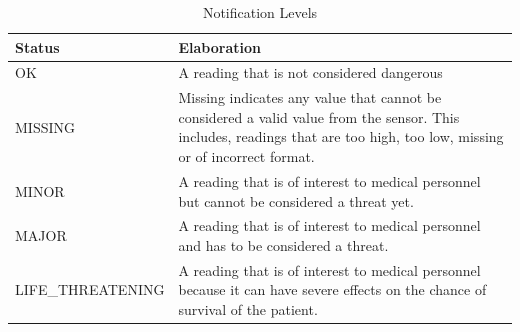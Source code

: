 \documentclass[a4paper]{article}
\newcommand{\arraystrechlength}{1.5}
\begin{document}
\begin{table}[H]
{\renewcommand{\arraystretch}{\arraystrechlength}
    \begin{tabular}{ | >{\columncolor{vu-grey-50}}m{105pt} | m{200pt} | }
    
    \hline
    \rowcolor{vu-blue}
    \textcolor{vu-white}{\textbf{Status}} &
    \textcolor{vu-white}{\textbf{Elaboration}}
    \\ \hline
    
    OK &
    A reading that is not considered dangerous
    \\ \hline
    MISSING &
    Missing indicates any value that cannot be considered a valid value from the sensor. This includes, readings that are too high, too low, missing or of incorrect format.
    \\ \hline
    MINOR &
    A reading that is of interest to medical personnel but cannot be considered a threat yet.
    \\ \hline
    MAJOR &
    A reading that is of interest to medical personnel and has to be considered a threat.
    \\ \hline
    LIFE\_THREATENING &
    A reading that is of interest to medical personnel because it can have severe effects on the chance of survival of the patient.
    \\ \hline
    \end{tabular}
}
\caption{Notification Levels}
\label{table:color_format}
\end{table}
\clearpage
\end{document}
